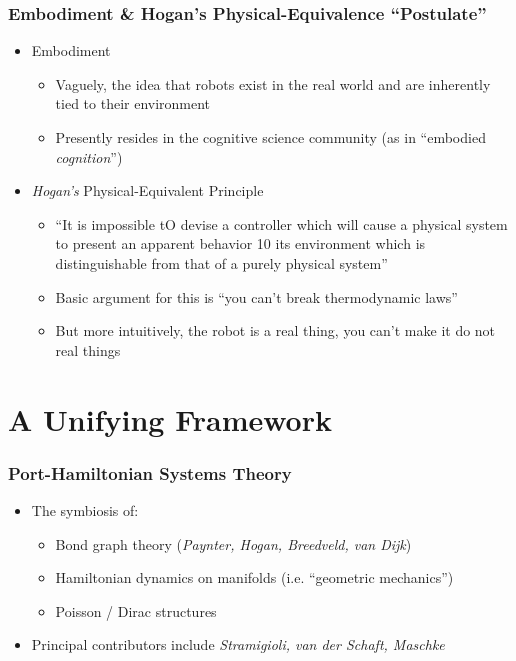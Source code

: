 \documentclass[aspectratio=169,handout]{beamer}
\begin{document}
		\begin{frame}
			\frametitle{Embodiment \& Hogan's Physical-Equivalence ``Postulate''}
			\begin{itemize}[<+->]
				\item Embodiment
					\begin{itemize}
						\item Vaguely, the idea that robots exist in the real world and are inherently tied to their environment
						\item Presently resides in the cognitive science community (as in ``embodied \emph{cognition}'')
					\end{itemize}
				\item \emph{Hogan's} Physical-Equivalent Principle
					\begin{itemize}
						\item ``It is impossible tO devise a controller which will cause a physical system to present an apparent behavior 10 its environment which is distinguishable from that of a purely physical system'' \autocite{hogan1985impedance}
						\item Basic argument for this is ``you can't break thermodynamic laws''
						\item But more intuitively, the robot is a real thing, you can't make it do not real things
					\end{itemize}
			\end{itemize}
		\end{frame}
	
	\section{A Unifying Framework}
		\begin{frame}
			\frametitle{Port-Hamiltonian Systems Theory}
			\begin{itemize}[<+->]
				\item The symbiosis of:
					\begin{itemize}[<+->]
						\item Bond graph theory (\emph{Paynter, Hogan, Breedveld, van Dijk})
						\item Hamiltonian dynamics on manifolds (i.e. ``geometric mechanics'')
						\item Poisson / Dirac structures
					\end{itemize}
				\item Principal contributors include \emph{Stramigioli, van der Schaft, Maschke}
			\end{itemize}
		\end{frame}
	
\end{document}
